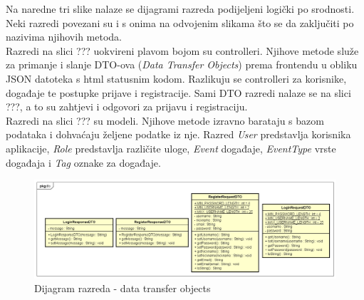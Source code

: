 			\indent Na naredne tri slike nalaze se dijagrami razreda podijeljeni logički po srodnosti. Neki razredi povezani su i s onima na odvojenim slikama što se da zaključiti po nazivima njihovih metoda. \\
			
			\indent Razredi na slici ??? uokvireni plavom bojom su controlleri. Njihove metode služe za primanje i slanje DTO-ova (\textit{Data Transfer Objects})  prema frontendu u obliku JSON datoteka s html statusnim kodom. Razlikuju se controlleri za korisnike, događaje te postupke prijave i registracije. Sami DTO razredi nalaze se na slici ???, a to su zahtjevi i odgovori za prijavu i registraciju.\\
			
			\indent Razredi na slici ??? su modeli. Njihove metode izravno barataju s bazom podataka i dohvaćaju željene podatke iz nje. Razred \textit{User} predstavlja korisnika aplikacije, \textit{Role} predstavlja različite uloge, \textit{Event} događaje, \textit{EventType} vrste događaja i \textit{Tag} oznake za događaje.
			
			\begin{figure}[h]
				\begin{center}
					\includegraphics[width=\textwidth]{dijagrami/UML dtoovi.png}
					\caption{Dijagram razreda - data transfer objects}
				\end{center}	
			\end{figure}
		
